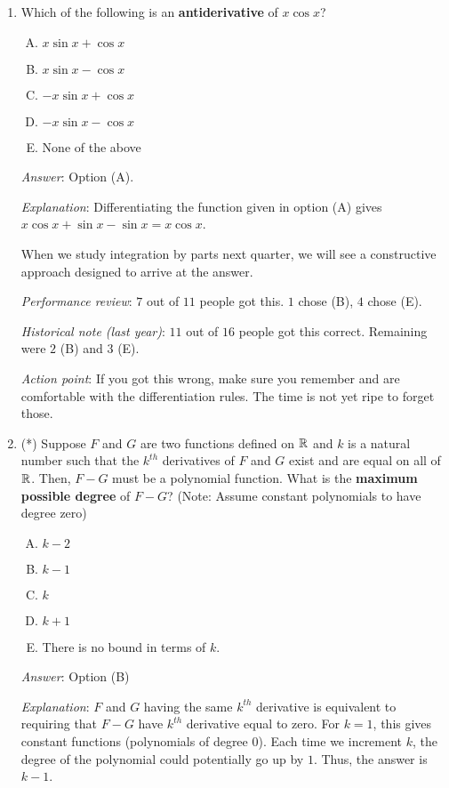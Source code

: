 \documentclass[10pt]{amsart}
\begin{document}
\begin{enumerate}
\item Which of the following is an {\bf antiderivative} of $x\cos x$?

  \begin{enumerate}[(A)]
  \item $x \sin x + \cos x$
  \item $x \sin x - \cos x$
  \item $-x \sin x + \cos x$
  \item $-x \sin x - \cos x$
  \item None of the above
  \end{enumerate}

  {\em Answer}: Option (A).

  {\em Explanation}: Differentiating the function given in option (A)
  gives $x\cos x + \sin x - \sin x = x\cos x$.

  When we study integration by parts next quarter, we will see a
  constructive approach designed to arrive at the answer.

  {\em Performance review}: $7$ out of $11$ people got this. $1$ chose
  (B), $4$ chose (E).

  {\em Historical note (last year)}: $11$ out of $16$ people got this
  correct. Remaining were $2$ (B) and $3$ (E).

  {\em Action point}: If you got this wrong, make sure you remember
  and are comfortable with the differentiation rules. The time is not
  yet ripe to forget those.

\item (*) Suppose $F$ and $G$ are two functions defined on $\mathbb{R}$ and
  $k$ is a natural number such that the $k^{th}$ derivatives of $F$
  and $G$ exist and are equal on all of $\mathbb{R}$. Then, $F - G$ must be a
  polynomial function. What is the {\bf maximum possible degree} of $F
  - G$?  (Note: Assume constant polynomials to have degree zero)

  \begin{enumerate}[(A)]
  \item $k - 2$
  \item $k - 1$
  \item $k$
  \item $k + 1$
  \item There is no bound in terms of $k$.
  \end{enumerate}

  {\em Answer}: Option (B)

  {\em Explanation}: $F$ and $G$ having the same $k^{th}$ derivative
  is equivalent to requiring that $F - G$ have $k^{th}$ derivative
  equal to zero. For $k = 1$, this gives constant functions
  (polynomials of degree $0$). Each time we increment $k$, the degree
  of the polynomial could potentially go up by $1$. Thus, the answer
  is $k - 1$.


\end{enumerate}
\end{document}
